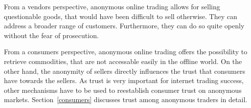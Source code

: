 From a vendors perspective, anonymous online trading allows for selling questionable goods, that would have been difficult to sell otherwise. They can address a broader range of customers. Furthermore, they can do so quite openly without the fear of prosecution.

From a consumers perspective, anonymous online trading offers the possibility to retrieve commodities, that are not accessable easily in the offline world. On the other hand, the anonymity of sellers directly influences the trust that consumers have towards the sellers. As trust is very important for internet trading success\cite{internetTrust2004}, other mechanisms  have to be used to reestablish consumer trust on anonymous markets. Section~\ref{consumers} discusses trust among anonymous traders in detail.